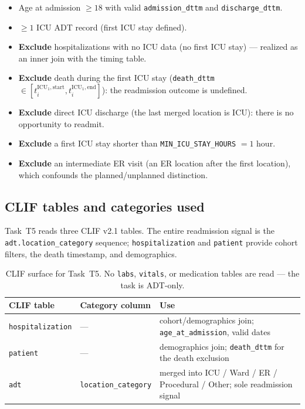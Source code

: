 \documentclass[11pt]{article}
\newcommand{\ticustart}{t^{\text{ICU}_1,\text{start}}}
\newcommand{\ticuend}{t^{\text{ICU}_1,\text{end}}}
\begin{document}
\begin{itemize}[leftmargin=2em]
  \item Age at admission $\ge 18$ with valid \texttt{admission\_dttm} and
        \texttt{discharge\_dttm}.
  \item $\geq 1$ ICU ADT record (first ICU stay defined).
  \item \textbf{Exclude} hospitalizations with no ICU data (no first ICU
        stay) --- realized as an inner join with the timing table.
  \item \textbf{Exclude} death during the first ICU stay
        (\texttt{death\_dttm} $\in [\ticustart_i, \ticuend_i]$): the
        readmission outcome is undefined.
  \item \textbf{Exclude} direct ICU discharge (the last merged location is
        ICU): there is no opportunity to readmit.
  \item \textbf{Exclude} a first ICU stay shorter than
        \texttt{MIN\_ICU\_STAY\_HOURS} $= 1$ hour.
  \item \textbf{Exclude} an intermediate ER visit (an ER location after the
        first location), which confounds the planned/unplanned distinction.
\end{itemize}

\subsection{CLIF tables and categories used}
\label{sec:t5-clif}

Task~T5 reads three CLIF v2.1 tables. The entire readmission signal is the
\texttt{adt.location\_category} sequence; \texttt{hospitalization} and
\texttt{patient} provide cohort filters, the death timestamp, and
demographics.

\begin{table}[H]
\centering
\small
\begin{tabular}{@{}llp{6.6cm}@{}}
\toprule
\textbf{CLIF table} & \textbf{Category column} & \textbf{Use} \\
\midrule
\texttt{hospitalization} & ---                       & cohort/demographics join; \texttt{age\_at\_admission}, valid dates \\
\texttt{patient}         & ---                       & demographics join; \texttt{death\_dttm} for the death exclusion \\
\texttt{adt}             & \texttt{location\_category} & merged into ICU / Ward / ER / Procedural / Other; sole readmission signal \\
\bottomrule
\end{tabular}
\caption{CLIF surface for Task~T5. No \texttt{labs}, \texttt{vitals}, or
medication tables are read --- the task is ADT-only.}
\end{table}
\end{document}
